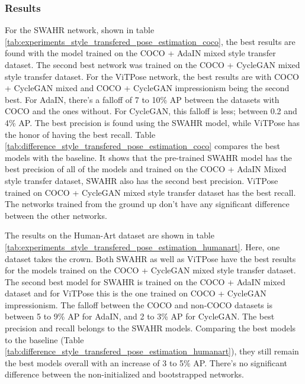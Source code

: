 \documentclass[conference]{IEEEtran}
\begin{document}
\subsubsection{Results}
For the SWAHR network, shown in table \ref{tab:experiments_style_transfered_pose_estimation_coco}, the best results are found with the model trained on the COCO + AdaIN mixed style transfer dataset.
The second best network was trained on the COCO + CycleGAN mixed style transfer dataset.
For the ViTPose network, the best results are with COCO + CycleGAN mixed and COCO + CycleGAN impressionism being the second best.
For AdaIN, there's a falloff of 7 to 10\% AP between the datasets with COCO and the ones without.
For CycleGAN, this falloff is less; between 0.2 and 4\% AP.
The best precision is found using the SWAHR model, while ViTPose has the honor of having the best recall.
Table \ref{tab:difference_style_transfered_pose_estimation_coco} compares the best models with the baseline.
It shows that the pre-trained SWAHR model has the best precision of all of the models and trained on the COCO + AdaIN Mixed style transfer dataset, SWAHR also has the second best precision.
ViTPose trained on COCO + CycleGAN mixed style transfer dataset has the best recall.
The networks trained from the ground up don't have any significant difference between the other networks.

The results on the Human-Art dataset are shown in table \ref{tab:experiments_style_transfered_pose_estimation_humanart}.
Here, one dataset takes the crown.
Both SWAHR as well as ViTPose have the best results for the models trained on the COCO + CycleGAN mixed style transfer dataset.
The second best model for SWAHR is trained on the COCO + AdaIN mixed dataset and for ViTPose this is the one trained on COCO + CycleGAN impressionism.
The falloff between the COCO and non-COCO datasets is between 5 to 9\% AP for AdaIN, and 2 to 3\% AP for CycleGAN.
The best precision and recall belongs to the SWAHR models.
Comparing the best models to the baseline (Table \ref{tab:difference_style_transfered_pose_estimation_humanart}), they still remain the best models overall with an increase of 3 to 5\% AP.
There's no significant difference between the non-initialized and bootstrapped networks.
\end{document}
